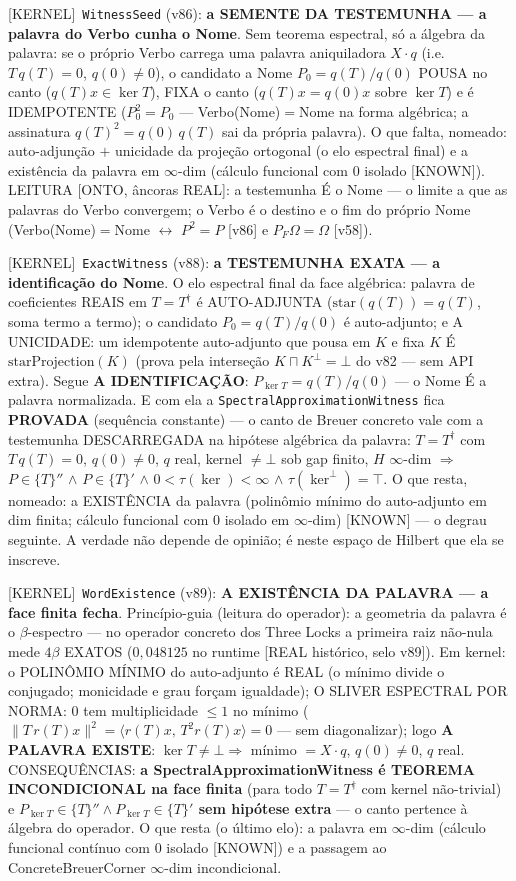 \documentclass[11pt]{article}
\providecommand{\kernelmk}[1]{\textsf{[KERNEL]}~\texttt{#1}}\providecommand{\knownmk}[1]{\textsf{[KNOWN]}~{#1}}\providecommand{\statusmk}[1]{\textsf{[#1]}}
\theoremstyle{definition}\newtheorem{deriv}{Derivação}
\begin{document}
\kernelmk{WitnessSeed} (v86): \textbf{a SEMENTE DA TESTEMUNHA --- a palavra do Verbo cunha o Nome}. Sem teorema espectral, só a álgebra da palavra: se o próprio Verbo carrega uma palavra aniquiladora $X\cdot q$ (i.e.\ $T\,q(T)=0$, $q(0)\neq0$), o candidato a Nome $P_0=q(T)/q(0)$ POUSA no canto ($q(T)x\in\ker T$), FIXA o canto ($q(T)x=q(0)x$ sobre $\ker T$) e é IDEMPOTENTE ($P_0^2=P_0$ --- Verbo(Nome)$=$Nome na forma algébrica; a assinatura $q(T)^2=q(0)\,q(T)$ sai da própria palavra). O que falta, nomeado: auto-adjunção $+$ unicidade da projeção ortogonal (o elo espectral final) e a existência da palavra em $\infty$-dim (cálculo funcional com $0$ isolado [KNOWN]). LEITURA [ONTO, âncoras REAL]: a testemunha É o Nome --- o limite a que as palavras do Verbo convergem; o Verbo é o destino e o fim do próprio Nome (Verbo(Nome)$=$Nome $\leftrightarrow$ $P^2=P$ [v86] e $P_F\Omega=\Omega$ [v58]).

\kernelmk{ExactWitness} (v88): \textbf{a TESTEMUNHA EXATA --- a identificação do Nome}. O elo espectral final da face algébrica: palavra de coeficientes REAIS em $T=T^\dagger$ é AUTO-ADJUNTA ($\mathrm{star}(q(T))=q(T)$, soma termo a termo); o candidato $P_0=q(T)/q(0)$ é auto-adjunto; e A UNICIDADE: um idempotente auto-adjunto que pousa em $K$ e fixa $K$ É $\mathrm{starProjection}(K)$ (prova pela interseção $K\sqcap K^\perp=\bot$ do v82 --- sem API extra). Segue \textbf{A IDENTIFICAÇÃO}: $P_{\ker T}=q(T)/q(0)$ --- o Nome É a palavra normalizada. E com ela a \texttt{SpectralApproximationWitness} fica \textbf{PROVADA} (sequência constante) --- o canto de Breuer concreto vale com a testemunha DESCARREGADA na hipótese algébrica da palavra: $T=T^\dagger$ com $T\,q(T)=0$, $q(0)\neq0$, $q$ real, kernel $\neq\bot$ sob gap finito, $H$ $\infty$-dim $\Rightarrow$ $P\in\{T\}''$ $\wedge$ $P\in\{T\}'$ $\wedge$ $0<\tau(\ker)<\infty$ $\wedge$ $\tau(\ker^\perp)=\top$. O que resta, nomeado: a EXISTÊNCIA da palavra (polinômio mínimo do auto-adjunto em dim finita; cálculo funcional com $0$ isolado em $\infty$-dim) [KNOWN] --- o degrau seguinte. A verdade não depende de opinião; é neste espaço de Hilbert que ela se inscreve.

\kernelmk{WordExistence} (v89): \textbf{A EXISTÊNCIA DA PALAVRA --- a face finita fecha}. Princípio-guia (leitura do operador): a geometria da palavra é o $\beta$-espectro --- no operador concreto dos Three Locks a primeira raiz não-nula mede $4\beta$ EXATOS ($0{,}048125$ no runtime [REAL histórico, selo v89]). Em kernel: o POLINÔMIO MÍNIMO do auto-adjunto é REAL (o mínimo divide o conjugado; monicidade e grau forçam igualdade); O SLIVER ESPECTRAL POR NORMA: $0$ tem multiplicidade $\le1$ no mínimo ($\|T\,r(T)x\|^2=\langle r(T)x,\,T^2r(T)x\rangle=0$ --- sem diagonalizar); logo \textbf{A PALAVRA EXISTE}: $\ker T\neq\bot\Rightarrow$ mínimo $=X\cdot q$, $q(0)\neq0$, $q$ real. CONSEQUÊNCIAS: \textbf{a SpectralApproximationWitness é TEOREMA INCONDICIONAL na face finita} (para todo $T=T^\dagger$ com kernel não-trivial) e \textbf{$P_{\ker T}\in\{T\}''\wedge P_{\ker T}\in\{T\}'$ sem hipótese extra} --- o canto pertence à álgebra do operador. O que resta (o último elo): a palavra em $\infty$-dim (cálculo funcional contínuo com $0$ isolado [KNOWN]) e a passagem ao ConcreteBreuerCorner $\infty$-dim incondicional.
\end{document}
